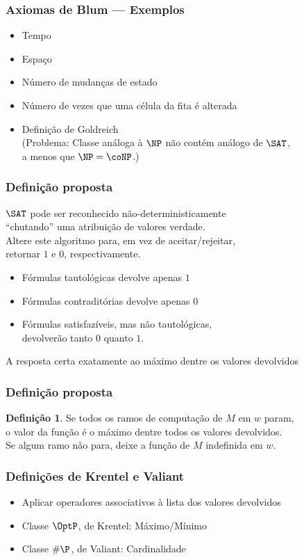 \documentclass[utf8,notheorems]{beamer}
\theoremstyle{definition}
\newtheorem*{definition}{Definição}
\begin{document}
\begin{frame}
    \frametitle{Axiomas de Blum --- Exemplos}
    \begin{itemize}
        \item Tempo
        \item Espaço
        \item Número de mudanças de estado
        \item Número de vezes que uma célula da fita é alterada
        \item Definição de Goldreich \\
            (Problema: Classe análoga à $\NP$ não contém análogo de $\SAT$, \\
            a menos que $\NP = \coNP$.)
    \end{itemize}
\end{frame}

\begin{frame}
    \frametitle{Definição proposta}
    $\SAT$ pode ser reconhecido não-deterministicamente \\
    ``chutando'' uma atribuição de valores verdade. \\
    Altere este algoritmo para, em vez de aceitar/rejeitar, \\
    retornar $1$ e $0$, respectivamente.
    \begin{itemize}
        \item Fórmulas tautológicas devolve apenas $1$
        \item Fórmulas contraditórias devolve apenas $0$
        \item Fórmulas satisfazíveis, mas não tautológicas, \\
            devolverão tanto $0$ quanto $1$.
    \end{itemize}
    A resposta certa exatamente ao máximo dentre os valores devolvidos
\end{frame}

\begin{frame}
    \frametitle{Definição proposta}
    \begin{definition}
        Se todos os ramos de computação de $M$ em $w$ param, \\
        o valor da função é o máximo dentre todos os valores devolvidos. \\
        Se algum ramo não para, deixe a função de $M$ indefinida em $w$.
    \end{definition}
\end{frame}

\begin{frame}
    \frametitle{Definições de Krentel e Valiant}
    \begin{itemize}
        \item Aplicar operadores associativos à lista dos valores devolvidos
        \item Classe $\OptP$, de Krentel: Máximo/Mínimo \cite{Krentel1988}
        \item Classe $\#\P$, de Valiant: Cardinalidade \cite{Valiant1979}
    \end{itemize}
\end{frame}
\end{document}
